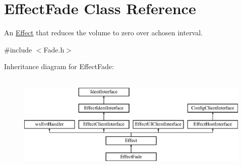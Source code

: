 \hypertarget{class_effect_fade}{}\section{Effect\+Fade Class Reference}
\label{class_effect_fade}


An \hyperlink{class_effect}{Effect} that reduces the volume to zero over achosen interval.  




{\ttfamily \#include $<$Fade.\+h$>$}

Inheritance diagram for Effect\+Fade\+:\begin{figure}[H]
\begin{center}
\leavevmode
\includegraphics[height=4.794520cm]{class_effect_fade}
\end{center}
\end{figure}
